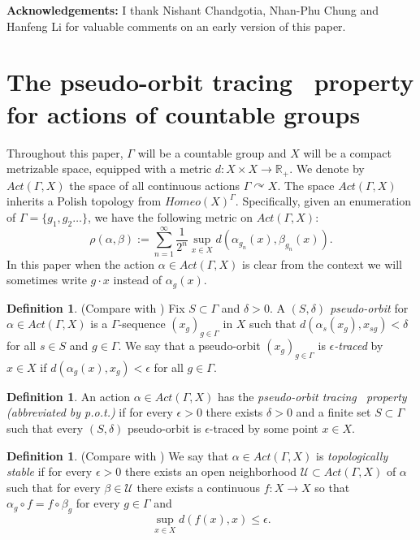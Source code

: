 \documentclass[oneside,english]{amsart}
\theoremstyle{definition}
\newtheorem{defn}[thm]{Definition}
\newcommand{\act}[2]{{#1} \curvearrowright {#2}}
\newcommand{\Act}[2]{\mathit{Act}({#1},{#2})}
\newcommand{\POT}{pseudo-orbit tracing}
\begin{document}
\textbf{Acknowledgements:} I thank Nishant Chandgotia, Nhan-Phu Chung and  Hanfeng Li for valuable comments on an early version of this paper.

\section{The \POT~ property for actions of countable groups}\label{sec:pot}

Throughout this paper, $\Gamma$ will be a countable group and $X$ will be a compact metrizable space, equipped with a metric $d:X\times X \to \mathbb{R}_+$.
We denote by $\Act{\Gamma}{X}$ the space of all continuous actions  $\act{\Gamma}{X}$. The space $\Act{\Gamma}{X}$ inherits a Polish topology  from $\mathit{Homeo}(X)^\Gamma$. Specifically,  given an enumeration of $\Gamma = \{g_1,g_2 \ldots\}$, we have the  following metric on $\Act{\Gamma}{X}$:
$$ \rho(\alpha,\beta) := \sum_{n=1}^\infty \frac{1}{2^n} \sup_{x \in X}d\left(\alpha_{g_n}(x),\beta_{g_n}(x)\right).$$
In this paper  when the action $\alpha \in \Act{\Gamma}{X}$ is clear from the context we will sometimes  write $g\cdot x$ instead of $\alpha_g(x)$.


\begin{defn}(Compare with \cite[Definition $2.5$]{1611.08994})
Fix $S \subset \Gamma$ and $\delta >0$.
A \emph{$(S,\delta)$ pseudo-orbit}  for $\alpha \in \Act{\Gamma}{X}$ is a $\Gamma$-sequence $(x_g)_{g \in \Gamma}$ in $X$ such that $d(\alpha_s(x_{g}),x_{sg})< \delta$ for all $s \in S$ and $g \in \Gamma$.
We say that a  pseudo-orbit $(x_g)_{g \in \Gamma}$ is \emph{$\epsilon$-traced} by $x \in X$ if $d(\alpha_g(x),x_g) <\epsilon$ for all $g \in \Gamma$.
\end{defn}

\begin{defn}
An action $\alpha \in \Act{\Gamma}{X}$ has the \emph{\POT~ property (abbreviated by p.o.t.)} if for every $\epsilon >0$ there exists $\delta >0$ and a finite set $S \subset \Gamma$ such that every $(S,\delta)$ pseudo-orbit is $\epsilon$-traced by some point $x \in X$.
\end{defn}

\begin{defn}(Compare with \cite[Definition $2.1$]{1611.08994})
We say that $\alpha \in \Act{\Gamma}{X}$ is \emph{topologically stable} if
for every $\epsilon >0$
there exists an open neighborhood $\mathcal{U} \subset \Act{\Gamma}{X}$ of $\alpha$ such that for every $\beta \in \mathcal{U}$ there exists a continuous $f:X \to X$ so that $\alpha_g \circ f= f \circ \beta_g$ for every $g \in \Gamma$ and
$$\sup_{x \in X}d(f(x),x) \le \epsilon.$$
\end{defn}
\end{document}
